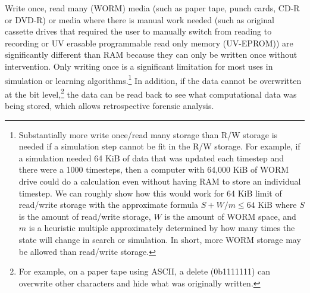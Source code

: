\documentclass[letterpaper,twocolumn]{article}
\begin{document}
Write once, read many (WORM) media (such as paper tape, punch cards,
CD-R or DVD-R) or media where there is manual work needed (such as
original cassette drives that required the user to manually switch
from reading to recording or UV erasable programmable read only memory
(UV-EPROM)) are significantly different than RAM because they can only
be written once without intervention. Only writing once is a
significant limitation for most uses in simulation or learning
algorithms.\footnote{Substantially more write once/read many storage
than R/W storage is needed if a simulation step cannot be fit in the
R/W storage. For example, if a simulation needed 64 KiB of data that
was updated each timestep and there were a 1000 timesteps, then a
computer with 64,000 KiB of WORM drive could do a calculation even
without having RAM to store an individual timestep. We can roughly
show how this would work for 64 KiB limit of read/write storage with
the approximate formula $S + W/m \le 64 \text{ KiB}$ where $S$ is the
amount of read/write storage, $W$ is the amount of WORM space, and $m$
is a heuristic multiple approximately determined by how many times the
state will change in search or simulation. In short, more WORM storage
may be allowed than read/write storage.} In addition, if the data
cannot be overwritten at the bit level,\footnote{For example, on a
paper tape using ASCII, a delete (0b1111111) can overwrite other
characters and hide what was originally written.} the data can be read
back to see what computational data was being stored, which allows
retrospective forensic analysis.
\end{document}
